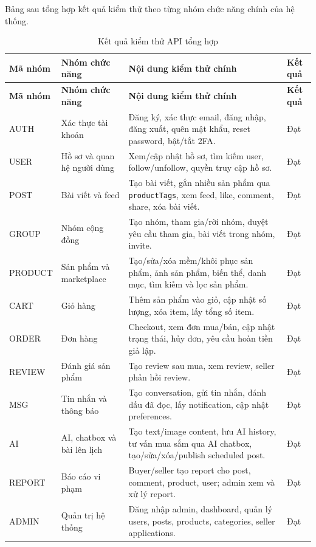 Bảng sau tổng hợp kết quả kiểm thử theo từng nhóm chức năng chính của hệ thống.

\begin{longtable}{|>{\raggedright\arraybackslash}p{}|p{}|p{}|p{}|}
\caption{Kết quả kiểm thử API tổng hợp} \\
\hline
\textbf{Mã nhóm} & \textbf{Nhóm chức năng} & \textbf{Nội dung kiểm thử chính} & \textbf{Kết quả} \\ \hline
\endfirsthead
\hline
\textbf{Mã nhóm} & \textbf{Nhóm chức năng} & \textbf{Nội dung kiểm thử chính} & \textbf{Kết quả} \\ \hline
\endhead
AUTH & Xác thực tài khoản & Đăng ký, xác thực email, đăng nhập, đăng xuất, quên mật khẩu, reset password, bật/tắt 2FA. & Đạt \\ \hline
USER & Hồ sơ và quan hệ người dùng & Xem/cập nhật hồ sơ, tìm kiếm user, follow/unfollow, quyền truy cập hồ sơ. & Đạt \\ \hline
POST & Bài viết và feed & Tạo bài viết, gắn nhiều sản phẩm qua \texttt{productTags}, xem feed, like, comment, share, xóa bài viết. & Đạt \\ \hline
GROUP & Nhóm cộng đồng & Tạo nhóm, tham gia/rời nhóm, duyệt yêu cầu tham gia, bài viết trong nhóm, invite. & Đạt \\ \hline
PRODUCT & Sản phẩm và marketplace & Tạo/sửa/xóa mềm/khôi phục sản phẩm, ảnh sản phẩm, biến thể, danh mục, tìm kiếm và lọc sản phẩm. & Đạt \\ \hline
CART & Giỏ hàng & Thêm sản phẩm vào giỏ, cập nhật số lượng, xóa item, lấy tổng số item. & Đạt \\ \hline
ORDER & Đơn hàng & Checkout, xem đơn mua/bán, cập nhật trạng thái, hủy đơn, yêu cầu hoàn tiền giả lập. & Đạt \\ \hline
REVIEW & Đánh giá sản phẩm & Tạo review sau mua, xem review, seller phản hồi review. & Đạt \\ \hline
MSG & Tin nhắn và thông báo & Tạo conversation, gửi tin nhắn, đánh dấu đã đọc, lấy notification, cập nhật preferences. & Đạt \\ \hline
AI & AI, chatbox và bài lên lịch & Tạo text/image content, lưu AI history, tư vấn mua sắm qua AI chatbox, tạo/sửa/xóa/publish scheduled post. & Đạt \\ \hline
REPORT & Báo cáo vi phạm & Buyer/seller tạo report cho post, comment, product, user; admin xem và xử lý report. & Đạt \\ \hline
ADMIN & Quản trị hệ thống & Đăng nhập admin, dashboard, quản lý users, posts, products, categories, seller applications. & Đạt \\ \hline
\end{longtable}

